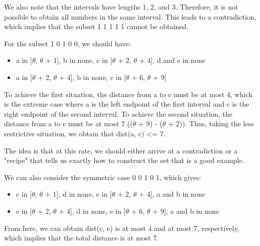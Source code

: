 \documentclass[11pt, a4paper]{article}
\begin{document}
\begin{large}
We also note that the intervals have lengths 1, 2, and 3. Therefore, it is not possible to obtain all numbers in the same interval. This leads to a contradiction, which implies that the subset 1 1 1 1 1 cannot be obtained.

For the subset 1 0 1 0 0, we should have:
\begin{itemize}
    \item a in [$\theta$, $\theta$ + 1], b in none, c in [$\theta$ + 2, $\theta$ + 4], d and e in none
    \item a in [$\theta$ + 2, $\theta$ + 4], b in none, c in [$\theta$ + 6, $\theta$ + 9]
\end{itemize}


To achieve the first situation, the distance from a to c must be at most 4, which is the extreme case where a is the left endpoint of the first interval and c is the right endpoint of the second interval. To achieve the second situation, the distance from a to c must be at most 7 (($\theta$ + 9) - ($\theta$ + 2)). Thus, taking the less restrictive situation, we obtain that dist(a, c) <= 7.

The idea is that at this rate, we should either arrive at a contradiction or a "recipe" that tells us exactly how to construct the set that is a good example.

We can also consider the symmetric case 0 0 1 0 1, which gives:
\begin{itemize}
    \item c in [$\theta$, $\theta$ + 1], d in none, e in [$\theta$ + 2, $\theta$ + 4], a and b in none
    \item c in [$\theta$ + 2, $\theta$ + 4], d in none, e in [$\theta$ + 6, $\theta$ + 9], a and b in none
\end{itemize}


From here, we can obtain dist(c, e) is at most 4 and at most 7, respectively, which implies that the total distance is at most 7.

\end{large}
\end{document}
